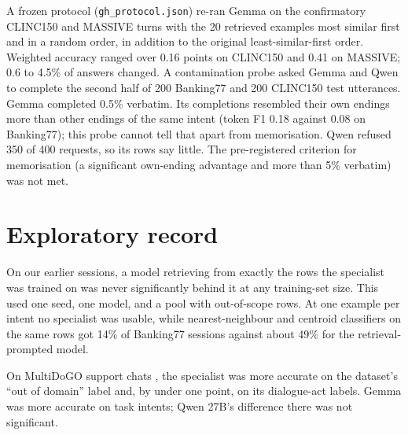 \documentclass[11pt]{article}
\begin{document}
A frozen protocol (\texttt{gh\_protocol.json}) re-ran Gemma on the confirmatory CLINC150 and MASSIVE turns with the 20 retrieved examples most similar first and in a random order, in addition to the original least-similar-first order. Weighted accuracy ranged over 0.16 points on CLINC150 and 0.41 on MASSIVE; 0.6 to 4.5\% of answers changed. A contamination probe asked Gemma and Qwen to complete the second half of 200 Banking77 and 200 CLINC150 test utterances. Gemma completed 0.5\% verbatim. Its completions resembled their own endings more than other endings of the same intent (token F1 0.18 against 0.08 on Banking77); this probe cannot tell that apart from memorisation. Qwen refused 350 of 400 requests, so its rows say little. The pre-registered criterion for memorisation (a significant own-ending advantage and more than 5\% verbatim) was not met.

\section{Exploratory record}
\label{app:exploratory}

On our earlier sessions, a model retrieving from exactly the rows the specialist was trained on was never significantly behind it at any training-set size. This used one seed, one model, and a pool with out-of-scope rows. At one example per intent no specialist was usable, while nearest-neighbour and centroid classifiers on the same rows got 14\% of Banking77 sessions against about 49\% for the retrieval-prompted model.

On MultiDoGO support chats \citep{peskov2019multidogo}, the specialist was more accurate on the dataset's ``out of domain'' label and, by under one point, on its dialogue-act labels. Gemma was more accurate on task intents; Qwen 27B's difference there was not significant.
\end{document}
